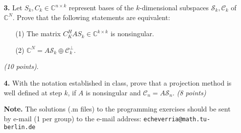 \documentclass[10pt]{report}
\begin{document}
\begin{enumerate}
\vspace{0.1cm} 

\item[\textbf{3.}] Let $S_k,C_k\in\mathbb{C}^{n\times k}$ represent bases of the $k$-dimensional subspaces $\mathcal{S}_k,\mathcal{C}_k$ of $\mathbb{C}^N$. Prove that the following statements are equivalent:
\begin{enumerate}
  \item[(1)] The matrix $C_K^HAS_k\in\mathbb{C}^{k\times k}$ is nonsingular.
  \item[(2)] $\mathbb{C}^{N}=A\mathcal{S}_k\oplus\mathcal{C}_k^\perp$.
\end{enumerate}
\textit{(10 points)}. 
\vspace{0.1cm} 

\item[\textbf{4.}] With the notation established in class, prove that a projection method is well defined at step $k$, if $A$ is nonsingular and $\mathcal{C}_n=A\mathcal{S}_n$. \textit{(8 points)}



%
%

\vspace{2cm} 

\item[\textbf{Note.}] The solutions (.m files) to the programming exercises should be sent by e-mail (1 per group) to the e-mail address: \verb+echeverria@math.tu-berlin.de+ \\


\end{enumerate}
\end{document}
